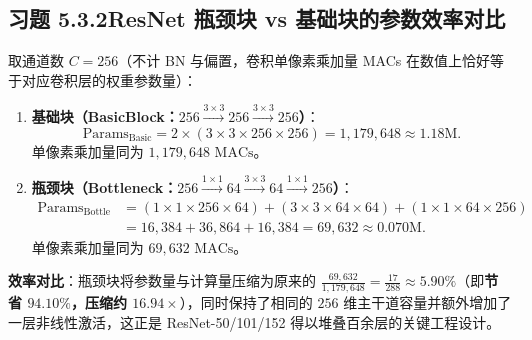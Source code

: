 \subsection*{习题 5.3.2\quad ResNet 瓶颈块 vs 基础块的参数效率对比}
取通道数 $C = 256$（不计 BN 与偏置，卷积单像素乘加量 MACs 在数值上恰好等于对应卷积层的权重参数量）：
\begin{enumerate}[label=(\alph*), leftmargin=1.8em]
  \item \textbf{基础块（BasicBlock：$256 \xrightarrow{3\times 3} 256 \xrightarrow{3\times 3} 256$）}：
  \[
    \text{Params}_{\text{Basic}} = 2 \times (3 \times 3 \times 256 \times 256) = 1{,}179{,}648 \approx 1.18\text{M}.
  \]
  单像素乘加量同为 $1{,}179{,}648\text{ MACs}$。

  \item \textbf{瓶颈块（Bottleneck：$256 \xrightarrow{1\times 1} 64 \xrightarrow{3\times 3} 64 \xrightarrow{1\times 1} 256$）}：
  \begin{align*}
    \text{Params}_{\text{Bottle}}
    &= (1 \times 1 \times 256 \times 64) + (3 \times 3 \times 64 \times 64) + (1 \times 1 \times 64 \times 256) \\
    &= 16{,}384 + 36{,}864 + 16{,}384 = 69{,}632 \approx 0.070\text{M}.
  \end{align*}
  单像素乘加量同为 $69{,}632\text{ MACs}$。
\end{enumerate}
\textbf{效率对比}：瓶颈块将参数量与计算量压缩为原来的 $\frac{69{,}632}{1{,}179{,}648} = \frac{17}{288} \approx 5.90\%$（即\textbf{节省 $94.10\%$，压缩约 $16.94\times$}），同时保持了相同的 $256$ 维主干道容量并额外增加了一层非线性激活，这正是 ResNet-50/101/152 得以堆叠百余层的关键工程设计。


